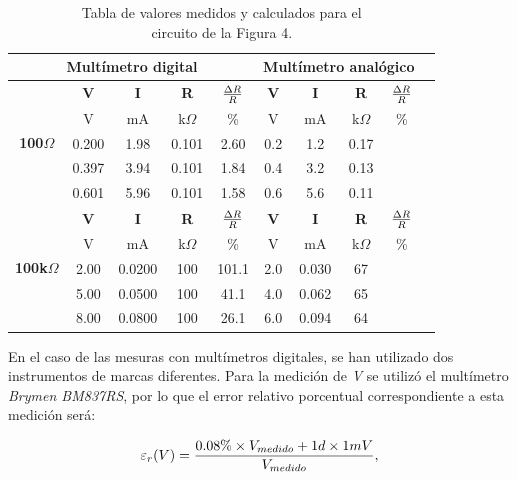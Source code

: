 \documentclass{article}
\begin{document}
\begin{table}[!hbt]
	\begin{center}

		\begin{tabular}{|c|c|c|c|c|c|c|c|c|c|} \hline
			\multicolumn{5}{|c|}{\textbf{Multímetro digital}} & \multicolumn{4}{|c|}{\textbf{Multímetro analógico}} \\ \hline
			\multirow{5}{*}{\textbf{100$\Omega$}} 
			& \textbf{V} & \textbf{I} & \textbf{R} & \textbf{${\Delta R \over R}$} & \textbf{V} & \textbf{I} & \textbf{R} & \textbf{${\Delta R \over R}$} \\\cline{2-9}
			& V & mA & k$\Omega$ & \% & V & mA & k$\Omega$ & \% \\\cline{2-9}
			& 0.200 & 1.98 & 0.101 & 2.60 & 0.2 & 1.2 & 0.17 &  \\\cline{2-9}
			& 0.397 & 3.94 & 0.101 & 1.84 & 0.4 & 3.2 & 0.13 &  \\\cline{2-9}
			& 0.601 & 5.96 & 0.101 & 1.58 & 0.6 & 5.6 & 0.11 &  \\ \hline
			\multirow{5}{*}{\textbf{100k$\Omega$}} 
			& \textbf{V} & \textbf{I} & \textbf{R} & \textbf{${\Delta R \over R}$} & \textbf{V} & \textbf{I} & \textbf{R} & \textbf{${\Delta R \over R}$} \\\cline{2-9}
			& V & mA & k$\Omega$ & \% & V & mA & k$\Omega$ & \% \\\cline{2-9}
			& 2.00 & 0.0200 & 100 & 101.1 & 2.0 & 0.030 & 67 &  \\\cline{2-9}
			& 5.00 & 0.0500 & 100 & 41.1 & 4.0 & 0.062 & 65 &  \\\cline{2-9}
			& 8.00 & 0.0800 & 100 & 26.1 & 6.0 & 0.094 & 64 &  \\ \hline
		\end{tabular}

	\caption{Tabla de valores medidos y calculados para el\\ circuito de la Figura 4.}
	\end{center}
\end{table}
\bigskip


	En el caso de las mesuras con multímetros digitales, se han utilizado dos instrumentos de marcas diferentes. Para la medición de \textit{V} se utilizó el multímetro \textit{Brymen BM837RS}, por lo que el error relativo porcentual correspondiente a esta medición será:
\medskip

\begin{equation}
 	\varepsilon_r(V) = {0.08\%\times V_{medido} + 1d\times 1mV \over V_{medido}},
\end{equation}
\medskip
\end{document}
